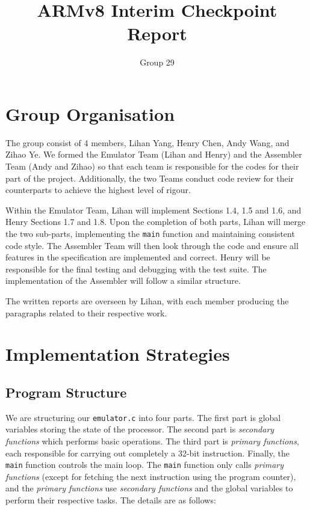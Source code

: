 \documentclass[11pt]{article}
\begin{document}
\title{ARMv8 Interim Checkpoint Report}
\author{Group 29}

\maketitle

\section{Group Organisation}

The group consist of 4 members, Lihan Yang, Henry Chen, Andy Wang, and Zihao Ye. We formed the Emulator Team (Lihan and Henry) and the Assembler Team (Andy and Zihao) so that each team is responsible for the codes for their part of the project. Additionally, the two Teams conduct code review for their counterparts to achieve the highest level of rigour.

Within the Emulator Team, Lihan will implement Sections 1.4, 1.5 and 1.6, and Henry Sections 1.7 and 1.8. Upon the completion of both parts, Lihan will merge the two sub-parts, implementing the \texttt{main} function and maintaining consistent code style. The Assembler Team will then look through the code and ensure all features in the specification are implemented and correct. Henry will be responsible for the final testing and debugging with the test suite. The implementation of the Assembler will follow a similar structure.

The written reports are overseen by Lihan, with each member producing the paragraphs related to their respective work.

\section{Implementation Strategies}

\subsection{Program Structure}

We are structuring our \texttt{emulator.c} into four parts. The first part is global variables storing the state of the processor. The second part is \textit{secondary functions} which performs basic operations. The third part is \textit{primary functions}, each responsible for carrying out completely a 32-bit instruction. Finally, the \texttt{main} function controls the main loop. The \texttt{main} function only calls \textit{primary functions} (except for fetching the next instruction using the program counter), and the \textit{primary functions} use \textit{secondary functions} and the global variables to perform their respective tasks. The details are as follows:
\end{document}
